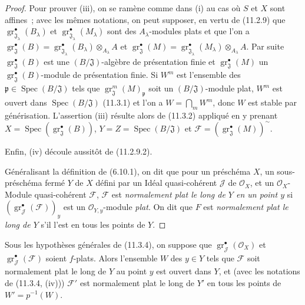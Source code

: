 \begin{proof}
Pour prouver (iii), on se ramène comme dans (i) au cas où $S$ et $X$ sont
affines~; avec les mêmes notations, on peut supposer, en vertu de (11.2.9) que
$\operatorname{gr}_{\mathfrak J_\lambda}^\bullet(B_\lambda)$ et
$\operatorname{gr}_{\mathfrak J_\lambda}^\bullet(M_\lambda)$ sont des
$A_\lambda$-modules plats et que l'on a
$\operatorname{gr}_{\mathfrak J}^\bullet(B)
=\operatorname{gr}_{\mathfrak J_\lambda}^\bullet(B_\lambda)\otimes_{A_\lambda}A$
et
$\operatorname{gr}_{\mathfrak J}^\bullet(M)
=\operatorname{gr}_{\mathfrak J_\lambda}^\bullet(M_\lambda)\otimes_{A_\lambda}A$.
Par suite $\operatorname{gr}_{\mathfrak J}^\bullet(B)$ est une
$(B/\mathfrak J)$-algèbre de présentation finie et
$\operatorname{gr}_{\mathfrak J}^\bullet(M)$ un
$\operatorname{gr}_{\mathfrak J}^\bullet(B)$-module de présentation finie. Si $W^m$
est l'ensemble des $\mathfrak p\in\operatorname{Spec}(B/\mathfrak J)$ tels que
$\operatorname{gr}_{\mathfrak J}^m(M)_\mathfrak p$ soit un
$(B/\mathfrak J)$-module plat, $W^m$ est ouvert dans
$\operatorname{Spec}(B/\mathfrak J)$ (11.3.1) et l'on a
$W=\bigcap_mW^m$, donc $W$ est stable par générisation. L'assertion (iii)
résulte alors de (11.3.2) appliqué en y prenant
$X=\operatorname{Spec}(\operatorname{gr}_{\mathfrak J}^\bullet(B))$,
$Y=Z=\operatorname{Spec}(B/\mathfrak J)$ et
$\mathcal F=(\operatorname{gr}_{\mathfrak J}^\bullet(M))^{\sim}$.

Enfin, (iv) découle aussitôt de (11.2.9.2).

Généralisant la définition de (6.10.1), on dit que pour un préschéma $X$, un
sous-préschéma fermé $Y$ de $X$ défini par un Idéal quasi-cohérent $\mathcal J$
de $\mathcal O_X$, et un $\mathcal O_X$-Module quasi-cohérent $\mathcal F$,
$\mathcal F$ est \emph{normalement plat le long de $Y$ en un point $y$} si
$(\operatorname{gr}_{\mathcal J}^\bullet(\mathcal F))_y$ est un
$\mathcal O_{Y,y}$-module \emph{plat}. On dit que $F$ est
\emph{normalement plat le long de $Y$} s'il l'est en tous les points de $Y$.
\end{proof}

\begin{corollary}[11.3.5]
\label{IV.11.3.5-fr}
Sous les hypothèses générales de \textup{(11.3.4)}, on suppose que
$\operatorname{gr}_{\mathcal J}^\bullet(\mathcal O_X)$ et
$\operatorname{gr}_{\mathcal J}^\bullet(\mathcal F)$ soient $f$-plats. Alors
l'ensemble $W$ des $y\in Y$ tels que $\mathcal F$ soit normalement plat le long
de $Y$ au point $y$ est ouvert dans $Y$, et (avec les notations de
\textup{(11.3.4, (iv)))} $\mathcal F'$ est normalement plat le long de $Y'$ en tous les
points de $W'=p^{-1}(W)$.
\end{corollary}

